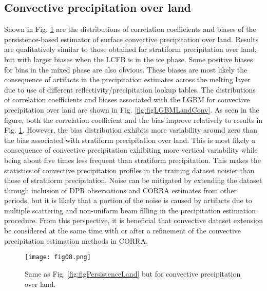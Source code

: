 \documentclass{ametsocV6.1} %
\begin{document}
\subsection{Convective precipitation over land}

Shown in Fig. \ref{fig:figPersistenceLandConv} are the distributions of correlation coefficients and biases of the persistence-based estimator of surface convective precipitation over land. Results are qualitatively similar to those obtained for stratiform precipitation over land, but with larger biases when the LCFB is in the ice phase. Some positive biases for bins in the mixed phase are also obvious. These biases are most likely the consequence of artifacts in the precipitation estimates across the melting layer due to use of different reflectivity/precipitation lookup tables. The distributions of correlation coefficients and biases associated with the LGBM for convective precipitation over land are shown in Fig. \ref{fig:figLGBMLandConv}. As seen in the figure, both the correlation coefficient and the bias improve relatively to results in Fig. \ref{fig:figPersistenceLandConv}. However, the bias distribution exhibits more variability around zero than the bias associated with stratiform precipitation over land.  This is most likely a consequence of convective precipitation exhibiting more vertical variability while being about five times less frequent than stratiform precipitation.  This makes the statistics of convective precipitation profiles in the training dataset noisier than those of stratiform precipitation.  Noise can be mitigated by extending the dataset through inclusion of DPR observations and CORRA estimates from other periods,  but it is likely that a portion of the noise is caused by artifacts due to multiple scattering and non-uniform beam filling in the precipitation estimation procedure.  From this perspective, it is beneficial that convective dataset extension be considered at the same time with or after a refinement of the convective precipitation estimation methods in CORRA.

\begin{center}
\begin{figure}
\texttt{[image: fig08.png]}\\
\caption{Same as Fig. \ref{fig:figPersistenceLand} but for convective precipitation over land.}
\label{fig:figPersistenceLandConv}
\end{figure}
\end{center}
\end{document}
